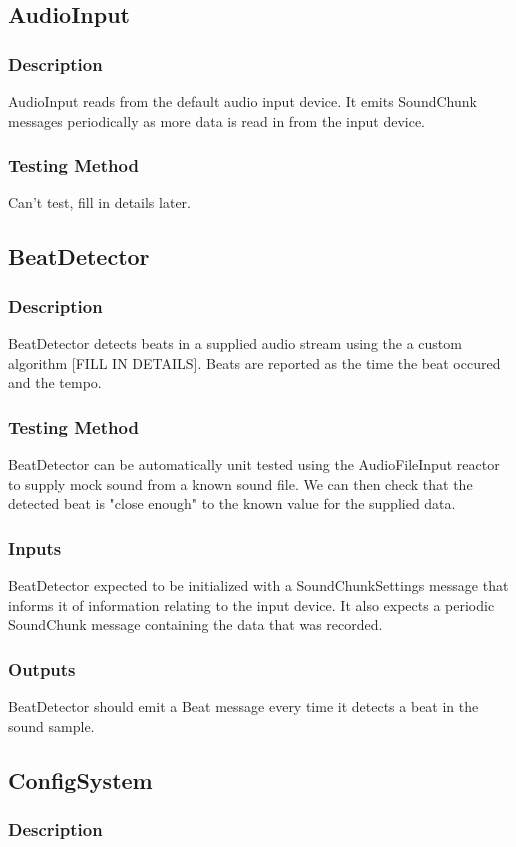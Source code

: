 \documentclass[a4paper]{article}
\begin{document}
	\subsection{AudioInput}
		\subsubsection{Description}
			AudioInput reads from the default audio input device.
			It emits SoundChunk messages periodically as more data is read in from the input device.
		\subsubsection{Testing Method}
			Can't test, fill in details later.

	\subsection{BeatDetector}
		\subsubsection{Description}
			BeatDetector detects beats in a supplied audio stream using the a custom algorithm [FILL IN DETAILS].
			Beats are reported as the time the beat occured and the tempo.
		\subsubsection{Testing Method}
			BeatDetector can be automatically unit tested using the AudioFileInput reactor to supply mock sound from a known sound file. 
			We can then check that the detected beat is "close enough" to the known value for the supplied data.
		\subsubsection{Inputs}
			BeatDetector expected to be initialized with a SoundChunkSettings message that informs it of information relating to the input device.
			It also expects a periodic SoundChunk message containing the data that was recorded.
		\subsubsection{Outputs}
			BeatDetector should emit a Beat message every time it detects a beat in the sound sample.

	\subsection{ConfigSystem}
		\subsubsection{Description}

		
\end{document}
